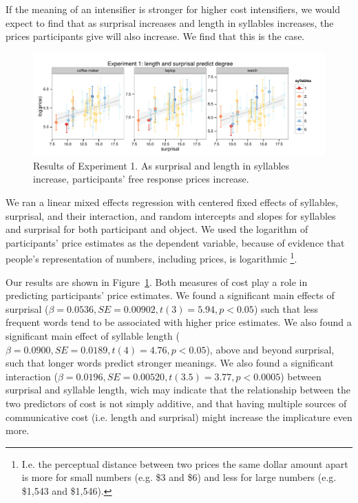 \documentclass[10pt,letterpaper]{article}
\begin{document}
If the meaning of an intensifier is stronger for higher cost intensifiers, we would expect to find that as surprisal increases and length in syllables increases, the prices participants give will also increase. We find that this is the case.


\begin{figure}[ht]
\begin{center}
\includegraphics[width=\textwidth]{exp1.pdf}
\end{center}
\caption{Results of Experiment 1. As surprisal and length in syllables increase, participants' free response prices increase.} 
\label{exp1-plot}
\end{figure}

We ran a linear mixed effects regression with centered fixed effects of syllables, surprisal, and their interaction, and random intercepts and slopes for syllables and surprisal for both participant and object.
We used the logarithm of participants' price estimates as the dependent variable, because of evidence that people's representation of numbers, including prices, is logarithmic \cite[e.g.]{dehaene}\footnote{I.e. the perceptual distance between two prices the same dollar amount apart is more for small numbers (e.g. \$3 and \$6) and less for large numbers (e.g. \$1,543 and \$1,546).}.

Our results are shown in Figure~\ref{exp1-plot}. Both measures of cost play a role in predicting participants' price estimates. We found a significant main effects of surprisal ($\beta=0.0536, SE=0.00902, t(3)=5.94, p<0.05$) such that less frequent words tend to be associated with higher price estimates. We also found a significant main effect of syllable length ($\beta=0.0900, SE=0.0189, t(4)=4.76, p<0.05$), above and beyond surprisal, such that longer words predict stronger meanings. We also found a significant interaction ($\beta=0.0196, SE=0.00520, t(3.5)=3.77, p<0.0005$) between surprisal and syllable length, wich may indicate that the relationship between the two predictors of cost is not simply additive, and that having multiple sources of communicative cost (i.e. length and surprisal) might increase the implicature even more.
\end{document}
